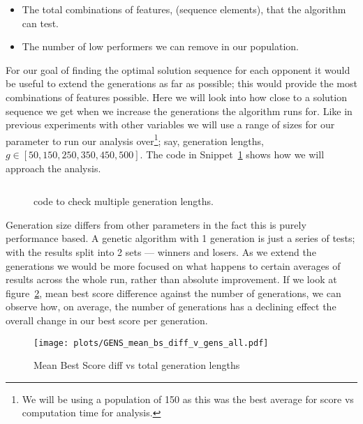 \begin{itemize}
    \item The total combinations of features, (sequence elements), that the algorithm can test.
    \item The number of low performers we can remove in our population.
\end{itemize}

For our goal of finding the optimal solution sequence for each opponent it would be useful to extend the generations as far as possible;
this would provide the most combinations of features possible.
Here we will look into how close to a solution sequence we get when we increase the generations the algorithm runs for.
Like in previous experiments with other variables we will use a range of sizes for our parameter to run our analysis
over\footnote{We will be using a population of 150 as this was the best average for score vs computation time for analysis.}; say, generation lengths, \(g \in [50,150,250,350,450,500]\).
The code in Snippet~\ref{code:generationChecker} shows how we will approach the analysis.\\

\begin{figure}
    \inputminted{python}{code_snippets/generationChecker.py}
    \caption{code to check multiple generation lengths.}\label{code:generationChecker}
\end{figure}

Generation size differs from other parameters in the fact this is purely performance based.
A genetic algorithm with 1 generation is just a series of tests;
with the results split into 2 sets --- winners and losers.
As we extend the generations we would be more focused on what happens to certain averages of results across the whole run, rather than absolute improvement.
If we look at figure~\ref{fig:GENS-mean-bs-diff-v-gens-all}, mean best score difference against the number of generations, we can observe how, on average, the number of generations has a declining effect the overall change in our best score per generation.\\

\begin{figure}[h]
    \texttt{[image: plots/GENS\_mean\_bs\_diff\_v\_gens\_all.pdf]}
    \caption{Mean Best Score diff vs total generation lengths}\label{fig:GENS-mean-bs-diff-v-gens-all}
\end{figure}

